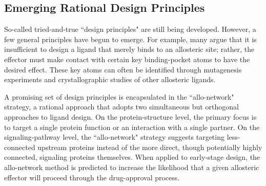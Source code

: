 \subsection{Emerging Rational Design Principles}
\par So-called tried-and-true ``design principles" are still being developed. However, a few general principles have begun to emerge. For example, many argue that it is insufficient to design a ligand that merely binds to an allosteric site; rather, the effector must make contact with certain key binding-pocket atoms to have the desired effect.\cite{Nussinov2012a,Wenthur2014} These key atoms can often be identified through mutagenesis experiments and crystallographic studies of other allosteric ligands.
\par A promising set of design principles is encapsulated in the ``allo-network" strategy, a rational approach that adopts two simultaneous but orthogonal approaches to ligand design.\cite{Szilagyi2013a} On the protein-structure level, the primary focus is to target a single protein function or an interaction with a single partner. On the signaling-pathway level, the ``allo-network" strategy suggests targeting less-connected upstream proteins instead of the more direct, though potentially highly connected, signaling proteins themselves. When applied to early-stage design, the allo-network method is predicted to increase the likelihood that a given allosteric effector will proceed through the drug-approval process.\cite{Nussinov2011,Szilagyi2013a,Csermelya2013}



